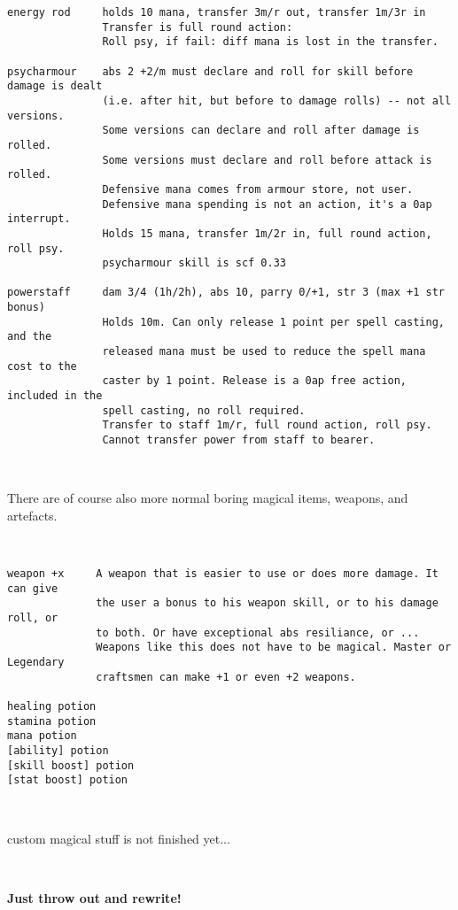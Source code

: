 \begin{verbatim}
energy rod     holds 10 mana, transfer 3m/r out, transfer 1m/3r in
               Transfer is full round action:
               Roll psy, if fail: diff mana is lost in the transfer.

psycharmour    abs 2 +2/m must declare and roll for skill before damage is dealt
               (i.e. after hit, but before to damage rolls) -- not all versions.
               Some versions can declare and roll after damage is rolled.
               Some versions must declare and roll before attack is rolled.
               Defensive mana comes from armour store, not user.
               Defensive mana spending is not an action, it's a 0ap interrupt.
               Holds 15 mana, transfer 1m/2r in, full round action, roll psy.
               psycharmour skill is scf 0.33

powerstaff     dam 3/4 (1h/2h), abs 10, parry 0/+1, str 3 (max +1 str bonus)
               Holds 10m. Can only release 1 point per spell casting, and the
               released mana must be used to reduce the spell mana cost to the
               caster by 1 point. Release is a 0ap free action, included in the
               spell casting, no roll required.
               Transfer to staff 1m/r, full round action, roll psy.
               Cannot transfer power from staff to bearer.
\end{verbatim} \normalsize

\

There are of course also more normal boring magical items, weapons, and artefacts.

\

\small \begin{verbatim}
weapon +x     A weapon that is easier to use or does more damage. It can give
              the user a bonus to his weapon skill, or to his damage roll, or
              to both. Or have exceptional abs resiliance, or ...
              Weapons like this does not have to be magical. Master or Legendary
              craftsmen can make +1 or even +2 weapons.

healing potion
stamina potion
mana potion
[ability] potion
[skill boost] potion
[stat boost] potion
\end{verbatim} \normalsize

\

\clearpage
\TODO custom magical stuff is not finished yet... 

\

\textbf{Just throw out and rewrite!}

\

